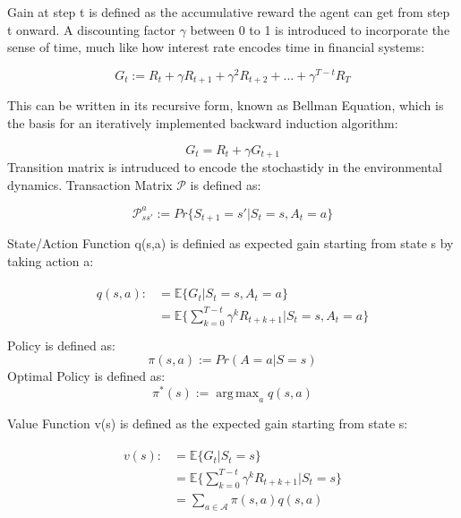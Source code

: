 \documentclass[journal]{IEEEtran}
\DeclareMathOperator*{\argmax}{arg\,max}  %
\begin{document}
Gain at step t is defined as the accumulative reward the agent can get from step t onward. A discounting factor $\gamma$ between 0 to 1 is introduced to incorporate the sense of time, much like how interest rate encodes time in financial systems:

\begin{equation}
G_{t} := R_{t}+\gamma R_{t+1}+\gamma ^2 R_{t+2}+...+\gamma^{T-t}R_{T}
\end{equation}


This can be written in its recursive form, known as Bellman Equation, which is the basis for an iteratively implemented backward induction algorithm:

\begin{equation}
        G_{t}=R_{t}+\gamma G_{t+1}
    \label{bellman}
\end{equation}
Transition matrix is intruduced to encode the stochastidy in the environmental dynamics. Transaction Matrix $\mathcal{P}$ is defined as:

\begin{equation}
    \mathcal{P}_{ss'}^a := Pr\{S_{t+1}=s'|S_{t}=s,A_{t}=a\}
\end{equation}


State/Action Function q(s,a) is definied as expected gain starting from state s by taking action a:

\begin{align}
\begin{split}
    q(s,a) :&= \mathbb{E}\{G_t|S_t=s,A_t=a\}\\
    &=\mathbb{E} \{\sum_{k=0}^{T-t} \gamma ^k R_{t+k+1}| S_t=s,A_t=a\}\\
\end{split}
\end{align}
Policy is defined as:
\begin{equation}
    \pi(s,a):=Pr(A=a|S=s)
\end{equation}
Optimal Policy is defined as:
\begin{equation}
    \pi^*(s):=\argmax_a q(s,a)
\end{equation}


Value Function v(s) is defined as the expected gain starting from state s:

\begin{align}
\begin{split}
    v(s) :&=  \mathbb{E}\{G_t|S_t=s\}\\
    &=\mathbb{E} \{\sum_{k=0}^{T-t} \gamma ^k R_{t+k+1}| S_t=s\}\\
    &=\sum_{a \in \mathcal{A}} \pi(s,a) q(s,a)\\
\end{split}
\end{align}
\end{document}

